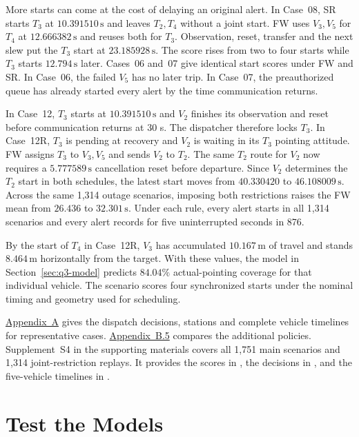 \documentclass{swmcmthesis}
\begin{document}
More starts can come at the cost of delaying an original alert. In Case~08, SR starts \(T_3\) at \(10.391510\,\mathrm s\) and leaves \(T_2,T_4\) without a joint start. FW uses \(V_3,V_5\) for \(T_4\) at \(12.666382\,\mathrm s\) and reuses both for \(T_3\). Observation, reset, transfer and the next slew put the \(T_3\) start at \(23.185928\,\mathrm s\). The score rises from two to four starts while \(T_3\) starts \(12.794\,\mathrm s\) later. Cases~06 and~07 give identical start scores under FW and SR. In Case~06, the failed \(V_5\) has no later trip. In Case~07, the preauthorized queue has already started every alert by the time communication returns.

In Case~12, \(T_3\) starts at \(10.391510\,\mathrm s\) and \(V_2\) finishes its observation and reset before communication returns at 30 s. The dispatcher therefore locks \(T_3\). In Case~12R, \(T_3\) is pending at recovery and \(V_2\) is waiting in its \(T_3\) pointing attitude. FW assigns \(T_3\) to \(V_3,V_5\) and sends \(V_2\) to \(T_2\). The same \(T_2\) route for \(V_2\) now requires a \(5.777589\,\mathrm s\) cancellation reset before departure. Since \(V_2\) determines the \(T_2\) start in both schedules, the latest start moves from \(40.330420\) to \(46.108009\,\mathrm s\). Across the same 1,314 outage scenarios, imposing both restrictions raises the FW mean from \(26.436\) to \(32.301\,\mathrm s\). Under each rule, every alert starts in all 1,314 scenarios and every alert records for five uninterrupted seconds in 876.

By the start of \(T_4\) in Case~12R, \(V_3\) has accumulated \(10.167\,\mathrm m\) of travel and stands \(8.464\,\mathrm m\) horizontally from the target. With these values, the model in Section~\ref{sec:q3-model} predicts \(84.04\%\) actual-pointing coverage for that individual vehicle. The scenario scores four synchronized starts under the nominal timing and geometry used for scheduling.

\hyperref[app:q4]{Appendix~A} gives the dispatch decisions, stations and complete vehicle timelines for representative cases. \hyperref[app:q4-alternatives]{Appendix~B.5} compares the additional policies. Supplement~S4 in the supporting materials covers all 1,751 main scenarios and 1,314 joint-restriction replays. It provides the scores in , the decisions in , and the five-vehicle timelines in .

\section{Test the Models}
\label{sec:model-tests}
\end{document}
